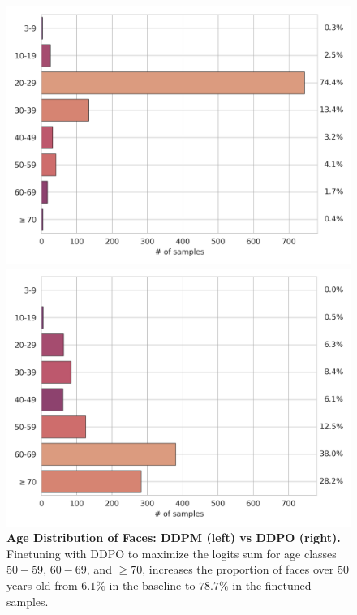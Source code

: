 \begin{figure}[ht]
  \centering
  \begin{minipage}{0.5\textwidth}
    \centering
    \includegraphics[width=1\textwidth]{img/results/age-dist-ddpm-celebahqsample-based-on-vit-age-preds-on-faces.png} %
  \end{minipage}\hfill
  \begin{minipage}{0.5\textwidth}
    \centering
    \includegraphics[width=1\textwidth]{img/results/age-dist-ddpo-celebahqsample-based-on-vit-age-preds-on-faces.png} %
  \end{minipage}
  \vspace{-8pt}  %
  \captionsetup{width=\textwidth} %
  \caption{\textbf{Age Distribution of Faces: DDPM (left) vs DDPO (right).} Finetuning with DDPO to maximize the logits sum for age classes 
  \texttt{$50-59$}, \texttt{$60-69$}, and \texttt{$\geq 70$}, increases the proportion of faces over $50$ years old from $6.1\%$ in the baseline to $78.7\%$ in the finetuned samples.}
  \label{fig:age-face-dist} 
\end{figure}


